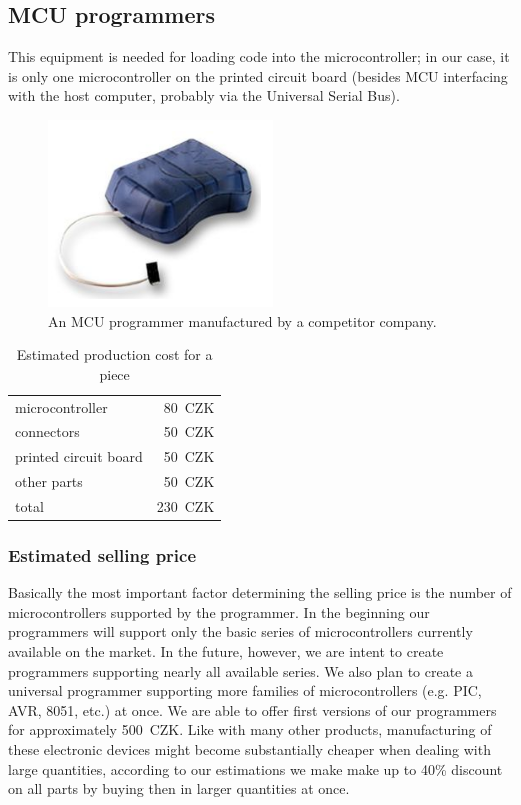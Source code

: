 \documentclass[a4paper,twoside,15pt]{book}
\begin{document}
		\subsection{MCU programmers}
			This equipment is needed for loading code into the microcontroller; in our case, it is only one microcontroller on the printed circuit board (besides MCU interfacing with the host computer, probably via the Universal Serial Bus).
			\begin{figure}[h!]
				\centering{}
				\includegraphics[width=.2\textwidth]{images/programmer.png}
				\caption{An MCU programmer manufactured by a competitor company.}
			\end{figure}

			\begin{table}[h!]
				\begin{tabular}{lr}
					microcontroller			& 80~CZK	\\
					connectors				& 50~CZK	\\
					printed circuit board	& 50~CZK	\\
					other parts				& 50~CZK	\\\hline
					total					& 230~CZK
				\end{tabular}
				\caption{Estimated production cost for a piece}
			\end{table}

			\subsubsection{Estimated selling price}
				Basically the most important factor determining the selling price is the number of microcontrollers supported by the programmer. In the beginning our programmers will support only the basic series of microcontrollers currently available on the market. In the future, however, we are intent to create programmers supporting nearly all available series. We also plan to create a universal programmer supporting more families of microcontrollers (e.g. PIC, AVR, 8051, etc.) at once. We are able to offer first versions of our programmers for approximately 500~CZK. Like with many other products, manufacturing of these electronic devices might become substantially cheaper when dealing with large quantities, according to our estimations we make make up to 40\% discount on all parts by buying then in larger quantities at once.
\end{document}
